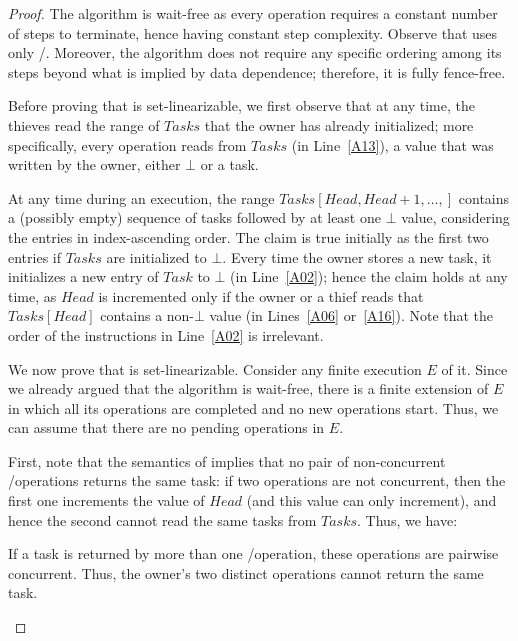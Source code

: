 \begin{proof}

The algorithm is wait-free as every operation requires a constant number of steps to terminate, hence having constant step complexity.  Observe that \Put uses only \R/\W.  Moreover, the algorithm does not require any specific ordering among its steps beyond what is implied by data dependence; therefore, it is fully fence-free.

Before proving that \WFWSM is set-linearizable, we first observe that at any time, the thieves read the range of \(Tasks\) that the owner has already initialized; more specifically, every \Steal operation reads from \(Tasks\) (in Line~\ref{A13}), a value that was written by the owner, either \(\bot\) or a task.

At any time during an execution, the range \(Tasks[Head, Head+1, \hdots, ]\) contains a (possibly empty) sequence of tasks followed by at least one \(\bot\) value, considering the entries in index-ascending order. The claim is true initially as the first two entries if \(Tasks\) are initialized to \(\bot\).  Every time the owner stores a new task, it initializes a new entry of \(Task\) to \(\bot\) (in Line~\ref{A02}); hence the claim holds at any time, as \(Head\) is incremented only if the owner or a thief reads that \(Tasks[Head]\) contains a non-\(\bot\) value (in Lines~\ref{A06} or~\ref{A16}).  Note that the order of the instructions in Line~\ref{A02} is irrelevant.

We now prove that \WFWSM is set-linearizable. Consider any finite execution \(E\) of it. Since we already argued that the algorithm is wait-free, there is a finite extension of \(E\) in which all its operations are completed and no new operations start.  Thus, we can assume that there are no pending operations in \(E\).

First, note that the semantics of \MaxW implies that no pair of non-concurrent \Take/\Steal operations returns the same task: if two operations are not concurrent, then the first one increments the value of \(Head\) (and this value can only increment), and hence the second cannot read the same tasks from \(Tasks\). Thus, we have:

\begin{remark}\label{remark-concurrency}
If a task is returned by more than one \Take/\Steal operation, these operations are pairwise concurrent.  Thus, the owner's two distinct \Take operations cannot return the same task.
\end{remark}



\end{proof}

